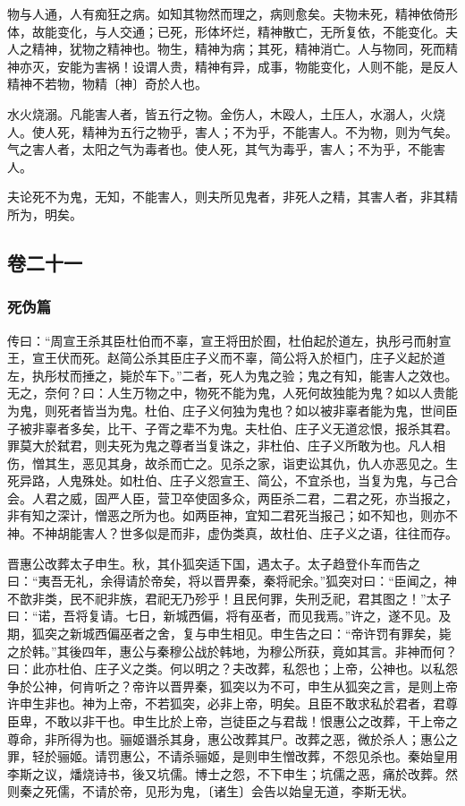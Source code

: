 \documentclass[]{article}
\begin{document}
物与人通，人有痴狂之病。如知其物然而理之，病则愈矣。夫物未死，精神依倚形体，故能变化，与人交通；已死，形体坏烂，精神散亡，无所复依，不能变化。夫人之精神，犹物之精神也。物生，精神为病；其死，精神消亡。人与物同，死而精神亦灭，安能为害祸！设谓人贵，精神有异，成事，物能变化，人则不能，是反人精神不若物，物精〔神〕奇於人也。

水火烧溺。凡能害人者，皆五行之物。金伤人，木殴人，土压人，水溺人，火烧人。使人死，精神为五行之物乎，害人；不为乎，不能害人。不为物，则为气矣。气之害人者，太阳之气为毒者也。使人死，其气为毒乎，害人；不为乎，不能害人。

夫论死不为鬼，无知，不能害人，则夫所见鬼者，非死人之精，其害人者，非其精所为，明矣。

\hypertarget{header-n803}{%
\subsection{卷二十一}\label{header-n803}}

\hypertarget{header-n804}{%
\subsubsection{死伪篇}\label{header-n804}}

传曰：``周宣王杀其臣杜伯而不辜，宣王将田於囿，杜伯起於道左，执彤弓而射宣王，宣王伏而死。赵简公杀其臣庄子义而不辜，简公将入於桓门，庄子义起於道左，执彤杖而捶之，毙於车下。''二者，死人为鬼之验；鬼之有知，能害人之效也。无之，奈何？曰：人生万物之中，物死不能为鬼，人死何故独能为鬼？如以人贵能为鬼，则死者皆当为鬼。杜伯、庄子义何独为鬼也？如以被非辜者能为鬼，世间臣子被非辜者多矣，比干、子胥之辈不为鬼。夫杜伯、庄子义无道忿恨，报杀其君。罪莫大於弑君，则夫死为鬼之尊者当复诛之，非杜伯、庄子义所敢为也。凡人相伤，憎其生，恶见其身，故杀而亡之。见杀之家，诣吏讼其仇，仇人亦恶见之。生死异路，人鬼殊处。如杜伯、庄子义怨宣王、简公，不宜杀也，当复为鬼，与己合会。人君之威，固严人臣，营卫卒使固多众，两臣杀二君，二君之死，亦当报之，非有知之深计，憎恶之所为也。如两臣神，宜知二君死当报己；如不知也，则亦不神。不神胡能害人？世多似是而非，虚伪类真，故杜伯、庄子义之语，往往而存。

晋惠公改葬太子申生。秋，其仆狐突适下国，遇太子。太子趋登仆车而告之曰：``夷吾无礼，余得请於帝矣，将以晋畀秦，秦将祀余。''狐突对曰：``臣闻之，神不歆非类，民不祀非族，君祀无乃殄乎！且民何罪，失刑乏祀，君其图之！''太子曰：``诺，吾将复请。七日，新城西偏，将有巫者，而见我焉。''许之，遂不见。及期，狐突之新城西偏巫者之舍，复与申生相见。申生告之曰：``帝许罚有罪矣，毙之於韩。''其後四年，惠公与秦穆公战於韩地，为穆公所获，竟如其言。非神而何？曰：此亦杜伯、庄子义之类。何以明之？夫改葬，私怨也；上帝，公神也。以私怨争於公神，何肯听之？帝许以晋畀秦，狐突以为不可，申生从狐突之言，是则上帝许申生非也。神为上帝，不若狐突，必非上帝，明矣。且臣不敢求私於君者，君尊臣卑，不敢以非干也。申生比於上帝，岂徒臣之与君哉！恨惠公之改葬，干上帝之尊命，非所得为也。骊姬谮杀其身，惠公改葬其尸。改葬之恶，微於杀人；惠公之罪，轻於骊姬。请罚惠公，不请杀骊姬，是则申生憎改葬，不怨见杀也。秦始皇用李斯之议，燔烧诗书，後又坑儒。博士之怨，不下申生；坑儒之恶，痛於改葬。然则秦之死儒，不请於帝，见形为鬼，〔诸生〕会告以始皇无道，李斯无状。
\end{document}
